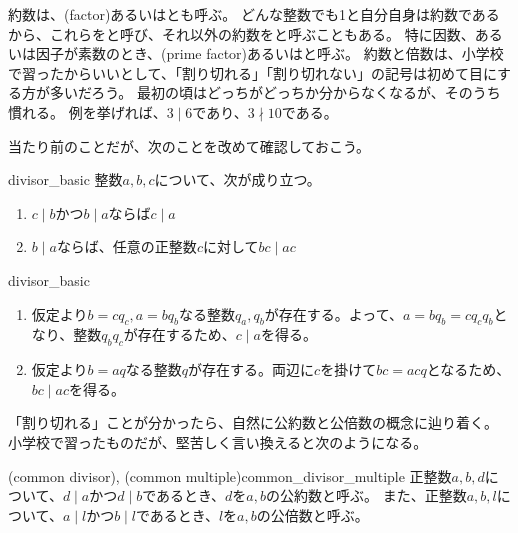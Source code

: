 約数は、(factor)あるいはとも呼ぶ。
どんな整数でも1と自分自身は約数であるから、これらをと呼び、それ以外の約数をと呼ぶこともある。
特に因数、あるいは因子が素数のとき、(prime factor)あるいはと呼ぶ。
約数と倍数は、小学校で習ったからいいとして、「割り切れる」「割り切れない」の記号は初めて目にする方が多いだろう。
最初の頃はどっちがどっちか分からなくなるが、そのうち慣れる。
例を挙げれば、$3 \mid 6$であり、$3 \nmid 10$である。

当たり前のことだが、次のことを改めて確認しておこう。

\begin{Prop}{}{divisor_basic}
整数$a,b,c$について、次が成り立つ。
\begin{enumerate}
 \item $c \mid b$かつ$b \mid a$ならば$c \mid a$
 \item $b \mid a$ならば、任意の正整数$c$に対して$bc \mid ac$
\end{enumerate}
\end{Prop}

\begin{prProof}{divisor_basic}\;
\begin{enumerate}
 \item 仮定より$b=cq_c, a=bq_b$なる整数$q_a,q_b$が存在する。よって、$a=bq_b=cq_cq_b$となり、整数$q_bq_c$が存在するため、$c \mid a$を得る。
 \item 仮定より$b=aq$なる整数$q$が存在する。両辺に$c$を掛けて$bc=acq$となるため、$bc \mid ac$を得る。
\end{enumerate}
\end{prProof}

「割り切れる」ことが分かったら、自然に公約数と公倍数の概念に辿り着く。
小学校で習ったものだが、堅苦しく言い換えると次のようになる。

\begin{Defi}{(common divisor), (common multiple)}{common_divisor_multiple}
正整数$a, b, d$について、$d \mid a$かつ$ d \mid b$であるとき、$d$を$a,b$の公約数と呼ぶ。
また、正整数$a, b, l$について、$a \mid l$かつ$b \mid l$であるとき、$l$を$a,b$の公倍数と呼ぶ。
\end{Defi}

